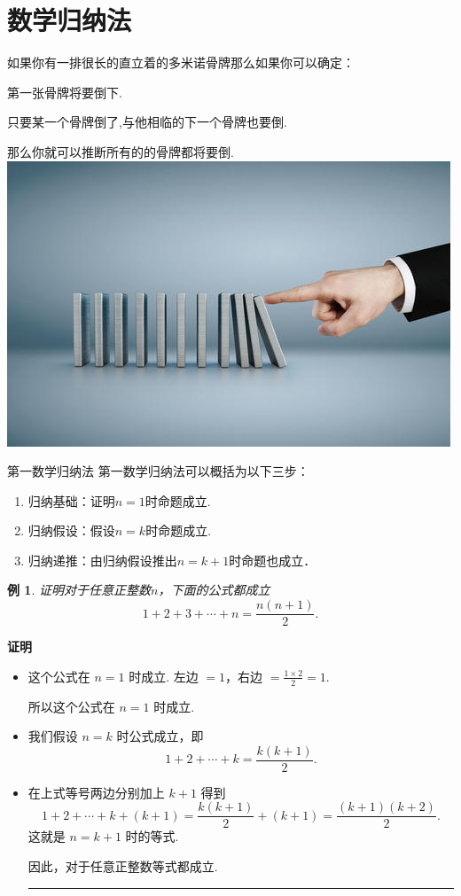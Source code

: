\documentclass[11pt,punct]{ctexbeamer}
\newtheorem{ex}{例}
\def\qed{\nopagebreak\hfill{\rule{4pt}{7pt}}\medbreak}
\def\pf{{\bf 证明~~ }}
\begin{document}
\section{数学归纳法}

\begin{frame}


如果你有一排很长的直立着的多米诺骨牌那么如果你可以确定：

第一张骨牌将要倒下.

只要某一个骨牌倒了,与他相临的下一个骨牌也要倒.

那么你就可以推断所有的的骨牌都将要倒. \\[15pt]
		\includegraphics[scale=0.4]{gupai.jpg}
\end{frame}


\begin{frame}{第一数学归纳法}
第一数学归纳法可以概括为以下三步：
\begin{enumerate}

\item 归纳基础：证明$n=1$时命题成立.
\item 归纳假设：假设$n=k$时命题成立.
\item 归纳递推：由归纳假设推出$n=k+1$时命题也成立．
\end{enumerate}
\end{frame}

\begin{frame}
\begin{ex}
证明对于任意正整数$n$，下面的公式都成立
\[
1+2+3+\cdots+n=\frac{n(n+1)}{2}.
\]
\end{ex}
\pause
\pf
\begin{itemize}
\item 这个公式在 $n=1$ 时成立.  左边 $= 1$，右边 $= \frac{1 \times 2}{2} = 1$.

所以这个公式在 $n=1$ 时成立.
\item 我们假设 $n=k$ 时公式成立，即
\[
1+2+\cdots+k=\frac{k(k+1)}{2}.
\]
\item 在上式等号两边分别加上 $k+1$ 得到
\[
1+2+\cdots+k+(k+1)=\frac{k(k+1)}{2}+(k+1) = \frac{(k+1)(k+2)}{2}.
\]
这就是 $n=k+1$ 时的等式.

因此，对于任意正整数等式都成立. \qed
\end{itemize}
\end{frame}
\end{document}
